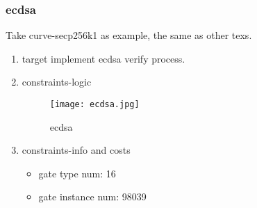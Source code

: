 \subsubsection{ecdsa}
\label{ecdsa}

Take curve-secp256k1 as example, the same as other texs.

\begin{enumerate}
    \item target
        implement ecdsa verify process. 
    \item constraints-logic
        \begin{figure}[!ht]
            \centering
            \texttt{[image: ecdsa.jpg]}
            \caption{ecdsa}
            \label{fig:ecdsa}
        \end{figure}  
    \item constraints-info and costs
        \begin{itemize}
            \item gate type num: 16
            \item gate instance num: 98039
        \end{itemize}
\end{enumerate}